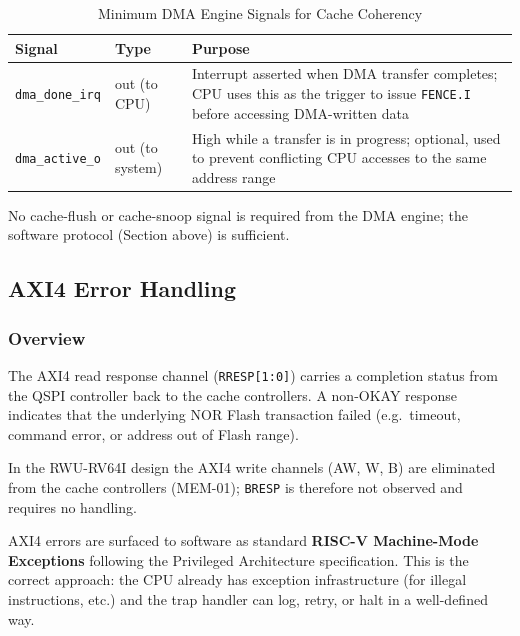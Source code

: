 \begin{table}[H]
\caption{Minimum DMA Engine Signals for Cache Coherency}
\label{tab:asDmaIf}
\centering
\begin{tabularx}{\textwidth}{|l |l |X|}
  \hline
  Signal & Type & Purpose \\
  \hline
  \hline
  \texttt{dma\_done\_irq} & out (to CPU) &
    Interrupt asserted when DMA transfer completes; CPU uses this as the
    trigger to issue \texttt{FENCE.I} before accessing DMA-written data \\
  \hline
  \texttt{dma\_active\_o} & out (to system) &
    High while a transfer is in progress; optional, used to prevent
    conflicting CPU accesses to the same address range \\
  \hline
\end{tabularx}
\end{table}

No cache-flush or cache-snoop signal is required from the DMA engine;
the software protocol (Section above) is sufficient.

\subsection{AXI4 Error Handling}
\label{subsec:axi4Error}

\subsubsection{Overview}

The AXI4 read response channel (\texttt{RRESP[1:0]}) carries a completion
status from the QSPI controller back to the cache controllers.
A non-OKAY response indicates that the underlying NOR Flash transaction
failed (e.g.\ timeout, command error, or address out of Flash range).

In the RWU-RV64I design the AXI4 write channels (AW, W, B) are eliminated
from the cache controllers (MEM-01); \texttt{BRESP} is therefore not
observed and requires no handling.

AXI4 errors are surfaced to software as standard
\textbf{RISC-V Machine-Mode Exceptions} following the Privileged
Architecture specification.
This is the correct approach: the CPU already has exception infrastructure
(for illegal instructions, etc.) and the trap handler can log, retry, or
halt in a well-defined way.

